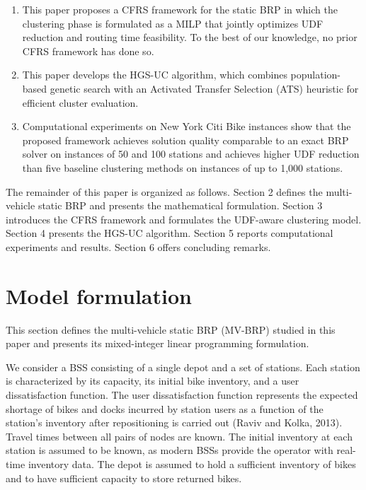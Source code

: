 \documentclass[11pt]{article}
\numberwithin{table}{section}
\numberwithin{figure}{section}
\begin{document}
\begin{enumerate}
\item This paper proposes a CFRS framework for the static BRP in which the clustering phase is formulated as a MILP that jointly optimizes UDF reduction and routing time feasibility. To the best of our knowledge, no prior CFRS framework has done so.
\item This paper develops the HGS-UC algorithm, which combines population-based genetic search with an Activated Transfer Selection (ATS) heuristic for efficient cluster evaluation.
\item Computational experiments on New York Citi Bike instances show that the proposed framework achieves solution quality comparable to an exact BRP solver on instances of 50 and 100 stations and achieves higher UDF reduction than five baseline clustering methods on instances of up to 1,000 stations.
\end{enumerate}

The remainder of this paper is organized as follows. Section 2 defines the multi-vehicle static BRP and presents the mathematical formulation. Section 3 introduces the CFRS framework and formulates the UDF-aware clustering model. Section 4 presents the HGS-UC algorithm. Section 5 reports computational experiments and results. Section 6 offers concluding remarks.

\section{Model formulation}

This section defines the multi-vehicle static BRP (MV-BRP) studied in this paper and presents its mixed-integer linear programming formulation.

We consider a BSS consisting of a single depot and a set of stations. Each station is characterized by its capacity, its initial bike inventory, and a user dissatisfaction function. The user dissatisfaction function represents the expected shortage of bikes and docks incurred by station users as a function of the station’s inventory after repositioning is carried out (Raviv and Kolka, 2013). Travel times between all pairs of nodes are known. The initial inventory at each station is assumed to be known, as modern BSSs provide the operator with real-time inventory data. The depot is assumed to hold a sufficient inventory of bikes and to have sufficient capacity to store returned bikes.
\end{document}
